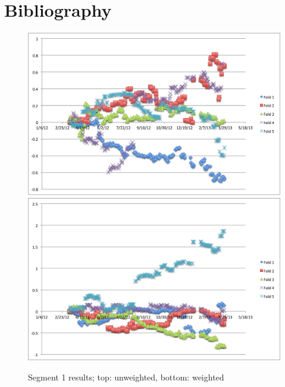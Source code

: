 \documentclass[11pt,letterpaper]{article}
\begin{document}
\section*{Bibliography}
{}


\begin{figure}
	\centering
	\centering
   	\includegraphics[width=14cm]{images/unweighted-exp-0.png}
    	\qquad
    	\includegraphics[width=14cm]{images/weighted-exp-0.png}
    	\caption{Segment 1 results; top: unweighted, bottom: weighted }%
    	\label{fig:1}
\end{figure}
\end{document}
